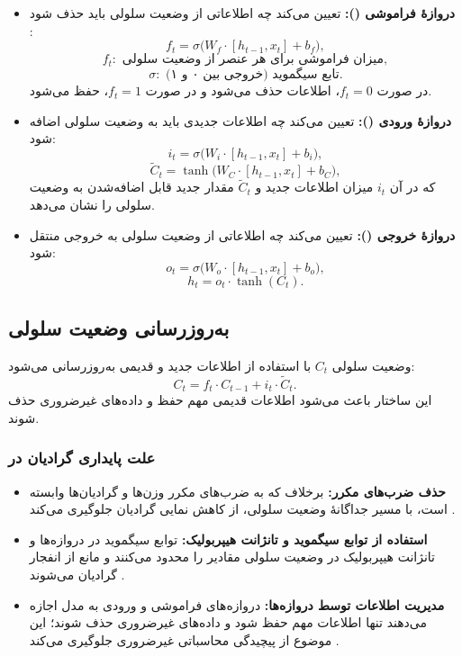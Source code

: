 \begin{itemize}
	\item \textbf{دروازهٔ فراموشی ():}
	تعیین می‌کند چه اطلاعاتی از وضعیت سلولی باید حذف شود
	\cite{gers1999learning}:
	\[
	f_t = \sigma \big( W_f \cdot [h_{t-1}, x_t] + b_f \big),
	\]
	\[
	f_t:\text{ میزان فراموشی برای هر عنصر از وضعیت سلولی},
	\]
	\[
	\sigma:\text{ تابع سیگموید (خروجی بین ۰ و ۱)}.
	\]
	در صورت \( f_t = 0 \)، اطلاعات حذف می‌شود و در صورت \( f_t = 1 \)، حفظ می‌شود.
	
	\item \textbf{دروازهٔ ورودی ():}
	تعیین می‌کند چه اطلاعات جدیدی باید به وضعیت سلولی اضافه شود:
	\[
	i_t = \sigma \big( W_i \cdot [h_{t-1}, x_t] + b_i \big),
	\]
	\[
	\tilde{C}_t = \tanh \big( W_C \cdot [h_{t-1}, x_t] + b_C \big),
	\]
	که در آن \( i_t \) میزان اطلاعات جدید و \( \tilde{C}_t \) مقدار جدید قابل اضافه‌شدن به وضعیت سلولی را نشان می‌دهد.
	
	\item \textbf{دروازهٔ خروجی ():}
	تعیین می‌کند چه اطلاعاتی از وضعیت سلولی به خروجی منتقل شود:
	\[
	o_t = \sigma \big( W_o \cdot [h_{t-1}, x_t] + b_o \big),
	\]
	\[
	h_t = o_t \cdot \tanh(C_t).
	\]
\end{itemize}

\subsection{به‌روزرسانی وضعیت سلولی}
وضعیت سلولی \( C_t \) با استفاده از اطلاعات جدید و قدیمی به‌روزرسانی می‌شود:
\[
C_t = f_t \cdot C_{t-1} + i_t \cdot \tilde{C}_t.
\]
این ساختار باعث می‌شود اطلاعات قدیمی مهم حفظ و داده‌های غیرضروری حذف شوند.

\subsubsection{علت پایداری گرادیان در }
\begin{itemize}
	\item \textbf{حذف ضرب‌های مکرر:}
	برخلاف  که به ضرب‌های مکرر وزن‌ها و گرادیان‌ها وابسته است،  با مسیر جداگانهٔ وضعیت سلولی، از کاهش نمایی گرادیان جلوگیری می‌کند
	\cite{hochreiter1998vanishing}.
	
	\item \textbf{استفاده از توابع سیگموید و تانژانت هیپربولیک:}
	توابع سیگموید در دروازه‌ها و تانژانت هیپربولیک در وضعیت سلولی مقادیر را محدود می‌کنند و مانع از انفجار گرادیان می‌شوند
	\cite{gers1999learning,goodfellow2016deep}.
	
	\item \textbf{مدیریت اطلاعات توسط دروازه‌ها:}
	دروازه‌های فراموشی و ورودی به مدل اجازه می‌دهند تنها اطلاعات مهم حفظ شود و داده‌های غیرضروری حذف شوند؛ این موضوع از پیچیدگی محاسباتی غیرضروری جلوگیری می‌کند
	\cite{hochreiter1997long}.
\end{itemize}


